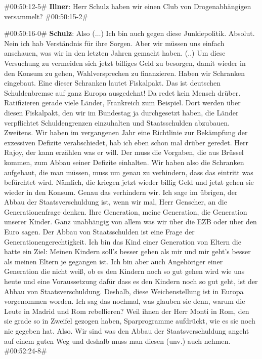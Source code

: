 \begin{description}
	\begin{linenumbers}[1]
		\item \#00:50:12-5\# \textbf{Illner}: Herr Schulz haben wir einen Club von Drogenabhängigen versammelt? \#00:50:15-2\#
		
		\item \#00:50:16-0\# \textbf{Schulz}: Also ($\ldots$) Ich bin auch gegen diese Junkiepolitik. Absolut. Nein ich hab Verständnis für ihre Sorgen. Aber wir müssen uns einfach anschauen, was wir in den letzten Jahren gemacht haben. (..) Um diese Versuchung zu vermeiden sich jetzt billiges Geld zu besorgen, damit wieder in den Konsum zu gehen, Wahlversprechen zu finanzieren. Haben wir Schranken eingebaut. Eine dieser Schranken lautet Fiskalpakt. Das ist deutschen Schuldenbremse auf ganz Europa ausgedehnt! Da redet kein Mensch drüber. Ratifizieren gerade viele Länder, Frankreich zum Beispiel. Dort werden über diesen Fiskalpakt, den wir im Bundestag ja durchgesetzt haben, die Länder verpflichtet Schuldengrenzen einzuhalten und Staatsschulden abzubauen. Zweitens. Wir haben im vergangenen Jahr eine Richtlinie zur Bekämpfung der exzessiven Defizite verabschiedet, hab ich eben schon mal drüber geredet. Herr Rajoy, der kann erzählen was er will. Der muss die Vorgaben, die aus Brüssel kommen, zum Abbau seiner Defizite einhalten. Wir haben also die Schranken aufgebaut, die man müssen, muss um genau zu verhindern, dass das eintritt was befürchtet wird. Nämlich, die kriegen jetzt wieder billig Geld und jetzt gehen sie wieder in den Konsum. Genau das verhindern wir. Ich sage im übrigen, der Abbau der Staatsverschuldung ist, wenn wir mal, Herr Genscher, an die Generationenfrage denken. Ihre Generation, meine Generation, die Generation unserer Kinder. Ganz unabhängig von allem was wir über die EZB oder über den Euro sagen. Der Abbau von Staatsschulden ist eine Frage der Generationengerechtigkeit. Ich bin das Kind einer Generation von Eltern die hatte ein Ziel: Meinen Kindern soll's besser gehen als mir und mir geht's besser als meinen Eltern je gegangen ist. Ich bin aber auch Angehöriger einer Generation die nicht weiß, ob es den Kindern noch so gut gehen wird wie uns heute und eine Voraussetzung dafür dass es den Kindern noch so gut geht, ist der Abbau von Staatsverschuldung. Deshalb, diese Weichenstellung ist in Europa vorgenommen worden. Ich sag das nochmal, was glauben sie denn, warum die Leute in Madrid und Rom rebellieren? Weil ihnen der Herr Monti in Rom, den sie grade so in Zweifel gezogen haben, Sparprogramme aufdrückt, wie es sie noch nie gegeben hat. Also. Wir sind was den Abbau der Staatsverschuldung angeht auf einem guten Weg und deshalb muss man diesen (unv.) auch nehmen. \#00:52:24-8\# 
	\end{linenumbers}
\end{description}

